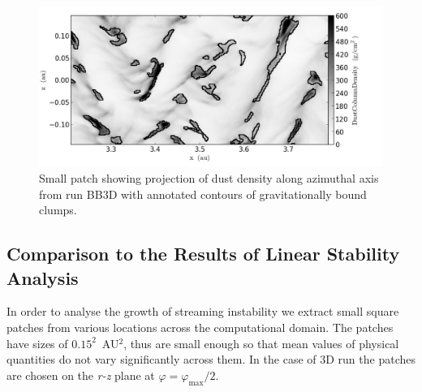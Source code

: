 \begin{figure} 
  \includegraphics[width=0.98\linewidth]{figures/fig6}
  \caption{
     Small patch showing projection of dust density along azimuthal axis from
     run BB3D with annotated contours of gravitationally bound clumps.}
  \label{fig6} 
\end{figure}

\subsection{Comparison to the Results of Linear Stability Analysis}
In order to analyse the growth of streaming instability we extract small square
patches from various locations across the computational domain. The patches have
sizes of $0.15^2$~AU$^2$, thus are small enough so that mean values of physical
quantities do not vary significantly across them. In the case of 3D run the
patches are chosen on the {\it r-z} plane at $\varphi = \varphi_\textrm{max} /
2$. 

